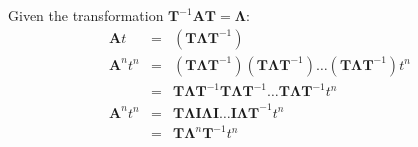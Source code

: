 Given the transformation $\mathbf{T}^{-1}\mathbf{AT}=\mathbf{\Lambda}$:
\begin{eqnarray*}
	\mathbf{A}t & = & (\mathbf{T\Lambda T}^{-1}) \\
	\mathbf{A}^nt^n & = & (\mathbf{T\Lambda T}^{-1})(\mathbf{T\Lambda T}^{-1})\ldots(\mathbf{T\Lambda T}^{-1})t^n \\
	                & = & \mathbf{T\Lambda T}^{-1}\mathbf{T\Lambda T}^{-1}\ldots\mathbf{T\Lambda T}^{-1}t^n \\
	\mathbf{A}^nt^n & = & \mathbf{T\Lambda}\mathbf{I}\mathbf{\Lambda I}\ldots\mathbf{I\Lambda T}^{-1}t^n \\
	\               & = & \mathbf{T\Lambda}^n\mathbf{T}^{-1}t^n \\
\end{eqnarray*}
\endinput

